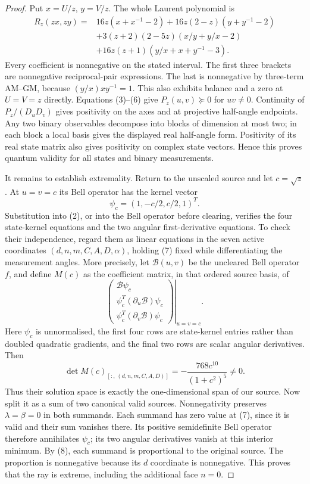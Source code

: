 \documentclass[11pt]{article}
\begin{document}
\begin{proof}
Put $x=U/z$, $y=V/z$. The whole Laurent polynomial is
\begin{align*}
R_z(zx,zy)={}&16z(x+x^{-1}-2)
 +16z(2-z)(y+y^{-1}-2)\\
 &+3(z+2)(2-5z)(x/y+y/x-2)\\
 &+16z(z+1)(y/x+x+y^{-1}-3).                              \tag{6}
\end{align*}
Every coefficient is nonnegative on the stated interval. The first three
brackets are nonnegative reciprocal-pair expressions. The last is
nonnegative by three-term AM--GM, because $(y/x)x y^{-1}=1$.
This also exhibits balance and a zero at $U=V=z$ directly.
Equations (3)--(6) give $P_z(u,v)\succeq0$ for $uv\ne0$.
Continuity of $P_z/(D_uD_v)$ gives positivity on the axes and at projective
half-angle endpoints. Any two binary observables decompose into blocks of dimension
at most two; in each block a local basis gives the displayed real
half-angle form. Positivity of its real state matrix also gives positivity
on complex state vectors. Hence this proves quantum validity for all
states and binary measurements.

It remains to establish extremality. Return to the unscaled source
and let $c=\sqrt z$. At $u=v=c$ its Bell operator has the kernel vector
\[
 \psi_c=(1,-c/2,c/2,1)^T.                                 \tag{7}
\]
Substitution into (2), or into the Bell operator before clearing, verifies
the four state-kernel equations and the two angular first-derivative
equations. To check their independence, regard them as linear equations
in the seven active coordinates $(d,n,m,C,A,D,\alpha)$, holding (7)
fixed while differentiating the measurement angles. More precisely, let
$\mathcal B(u,v)$ be the uncleared Bell operator $f$, and define $M(c)$
as the coefficient matrix, in that ordered source basis, of
\[
 \left.\begin{pmatrix}
 \mathcal B\psi_c\\
 \psi_c^T(\partial_u\mathcal B)\psi_c\\
 \psi_c^T(\partial_v\mathcal B)\psi_c
 \end{pmatrix}\right|_{u=v=c}.
\]
Here $\psi_c$ is unnormalised, the first four rows are state-kernel
entries rather than doubled quadratic gradients, and the final two rows
are scalar angular derivatives. Then
\[
 \det M(c)_{[:,\,(d,n,m,C,A,D)]}
       =-\frac{768c^{10}}{(1+c^2)^5}\ne0.                 \tag{8}
\]
Thus their solution space is exactly the one-dimensional span of our
source. Now split it as a sum of two canonical valid sources.
Nonnegativity preserves $\lambda=\beta=0$ in both summands. Each summand
has zero value at (7), since it is valid and their sum vanishes there.
Its positive semidefinite Bell operator therefore annihilates $\psi_c$;
its two angular derivatives vanish at this interior minimum. By (8),
each summand is proportional to the original source. The proportion is
nonnegative because its $d$ coordinate is nonnegative. This proves that
the ray is extreme, including the additional face $n=0$.
\end{proof}
\end{document}
